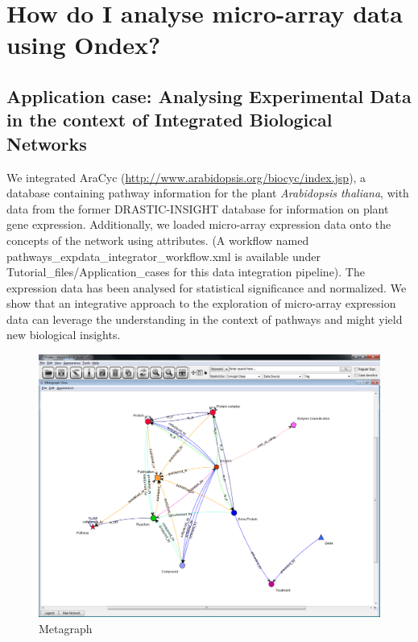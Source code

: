 
\chapter{How do I analyse micro-array data using Ondex?}
\label{cha:pie}


\section*{Application case: Analysing Experimental Data in the context of Integrated Biological Networks}
\label{sec:pie_charts_app}

We integrated AraCyc (\url{http://www.arabidopsis.org/biocyc/index.jsp}), a database containing pathway information for the plant 
\textit{Arabidopsis thaliana}, with data from the former DRASTIC-INSIGHT database for information on plant gene expression. 
Additionally, we loaded micro-array expression data onto the concepts of the network using attributes. 
(A workflow named pathways\_expdata\_integrator\_workflow.xml is available under Tutorial\_files/Application\_cases for this data integration pipeline).
The expression data has been analysed for statistical significance and normalized.
We show that an integrative approach to the exploration of micro-array expression data can leverage the understanding in the context of pathways 
and might yield new biological insights.
\begin{figure}[H]
\centering
\includegraphics[scale=0.35]{images/Oct12/app1fig1.png} 
\caption{Metagraph}
\label{fig:metagraph_pathways}
\end{figure}
